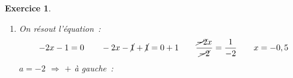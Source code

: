 \documentclass[10pt]{article}
\newtheorem{exo}{Exercice}
\begin{document}
\begin{exo}
\begin{enumerate}
\item On résout l'équation~:
\[-2x-1=0\qquad -2x-\cancel{1}+\cancel{1}=0+1\qquad \frac{\cancel{-2}x}{\cancel{-2}}=\frac{1}{-2}\qquad x=-0,5\]
$a=-2$ $\Rightarrow$ $+$ à gauche~:

\medskip
\begin{center}
\end{center}
\end{enumerate}
\end{exo}
\end{document}

